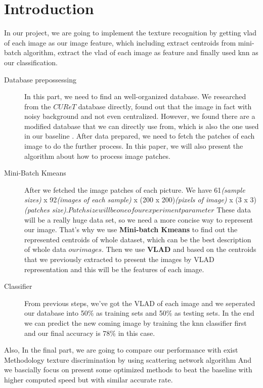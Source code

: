 \documentclass[final,leqno,onefignum,onetabnum]{siamltexmm}
\begin{document}
\section{Introduction}
In our project, we are going to implement the texture recognition by getting vlad of each image as our image feature, which including extract centroids from mini-batch algorithm, extract the vlad of each image as feature and finally used knn as our classification. 
\begin{description}
	\item[Database prepossessing]
	In this part, we need to find an well-organized database. We researched from the \(CUReT\) database \cite{dataref} directly, found out that the image in fact with noisy background and not even centralized. However, we found there are a modified database that we can directly use from, which is also the one used in our baseline \cite{dataref_mod}\cite{dataset_mod}.
	After data prepared, we need to fetch the patches of each image to do the further process. In this paper, we will also present the algorithm about how to process image patches.
	\item[Mini-Batch Kmeans] After we fetched the image patches of each picture. We have 61\textit{(sample sizes)} x 92\textit{(images of each sample)} x (200 x 200)\textit{(pixels of image)} x (3 x 3)\textit{(patches size)}.\(Patch size will be one of our experiment parameter\) These data will be a really huge data set, so we need a more concise way to represent our image. That's why we use \textbf{Mini-batch Kmeans} to find out the represented centroids of whole dataset, which can be the best description of whole data \( our images\). Then we use \textbf{VLAD} and based on the centroids that we previously extracted to present the images by VLAD representation and this will be the features of each image.
	\item[Classifier] From previous steps, we've got the VLAD of each image and we seperated our database into 50\% as training sets and 50\% as testing sets. In the end we can predict the new coming image by training the knn classifier first and our final accuracy is 78\% in this case. 
\end{description}

Also, In the final part, we are going to compare our performance with exist Methodology texture discrimination by using scattering network algorithm \cite{baseline} And we bascially focus on present some optimized methods to beat the baseline with higher computed speed but with similar accurate rate.
\end{document}
